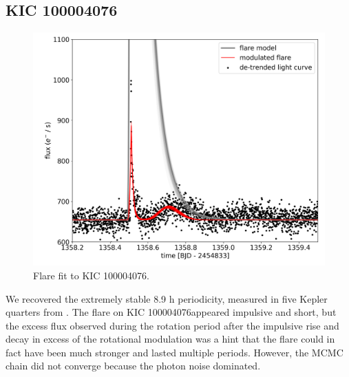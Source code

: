 \documentclass[fleqn,usenatbib,letters]{mnras}%
\newcommand{\FD}{EPIC 212035340} %
\newcommand{\FE}{KIC 100004076} %
\begin{document}
\subsection{\FE}
\begin{figure}
	\includegraphics[width=\columnwidth]{figures/13_12_2019_10_18_KIC100004076_flarefit_50retrievals.png}
    \caption{Flare fit to \FE.}
    \label{fig:fit\FE}
\end{figure}
We recovered the extremely stable 8.9 h periodicity, measured in five Kepler quarters from \citep{gizis2013}. The flare on \FE appeared impulsive and short, but the excess flux observed during the rotation period after the impulsive rise and decay in excess of the rotational modulation was a hint that the flare could in fact have been much stronger and lasted multiple periods. However, the MCMC chain did not converge because the photon noise dominated.


\end{document}
